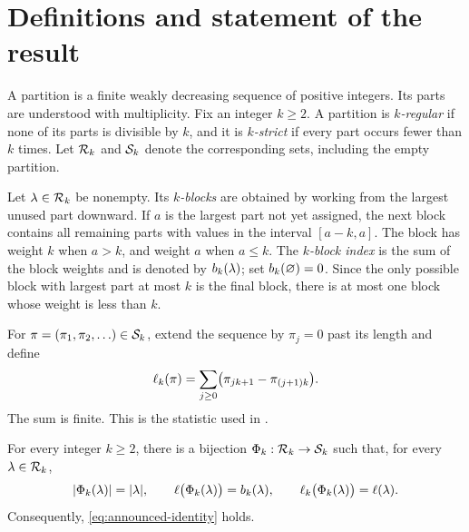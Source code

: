 \section{Definitions and statement of the result}\label{sec:definitions}

A partition is a finite weakly decreasing sequence of positive integers. Its
parts are understood with multiplicity. Fix an integer $k\geq2$. A partition
is \emph{$k$-regular} if none of its parts is divisible by $k$, and it is
\emph{$k$-strict} if every part occurs fewer than $k$ times. Let $\mathcal{R}_k$ and
$\mathcal{S}_k$ denote the corresponding sets, including the empty partition.

Let $\lambda\in\mathcal{R}_k$ be nonempty. Its \emph{$k$-blocks} are obtained by
working from the largest unused part downward. If $a$ is the largest part not
yet assigned, the next block contains all remaining parts with values in the
interval $[a-k,a]$. The block has weight $k$ when $a>k$, and weight $a$ when
$a\leq k$. The \emph{$k$-block index} is the sum of the block weights and is
denoted by $b_k(\lambda)$; set $b_k(\varnothing)=0$. Since the only possible
block with largest part at most $k$ is the final block, there is at most one
block whose weight is less than $k$.

For $\pi=(\pi_1,\pi_2,\ldots)\in\mathcal{S}_k$, extend the sequence by
$\pi_j=0$ past its length and define
\begin{equation}\label{eq:k-alternating-length}
 \ell_k(\pi)=\sum_{j\geq0}\bigl(\pi_{jk+1}-\pi_{(j+1)k}\bigr).
\end{equation}
The sum is finite. This is the statistic used in \cite{WangZhang2026}.

\begin{theorem}\label{thm:main}
For every integer $k\geq2$, there is a bijection $\Phi_k:\mathcal{R}_k\to\mathcal{S}_k$ such
that, for every $\lambda\in\mathcal{R}_k$,
\begin{equation}\label{eq:statistic-preservation}
 |\Phi_k(\lambda)|=|\lambda|,\qquad
 \ell\bigl(\Phi_k(\lambda)\bigr)=b_k(\lambda),\qquad
 \ell_k\bigl(\Phi_k(\lambda)\bigr)=\ell(\lambda).
\end{equation}
Consequently, \eqref{eq:announced-identity} holds.
\end{theorem}
